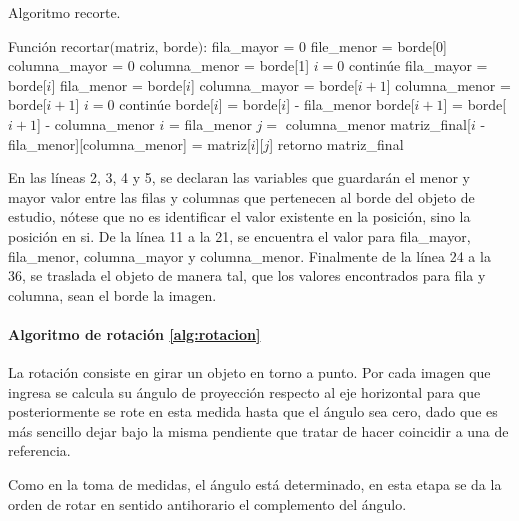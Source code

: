 \begin{algorithm}
\caption{Algoritmo recorte.}
\label{alg:extraccion}
\begin{algorithmic}[1]
\STATE Función recortar$($matriz, borde$)$:
\STATE fila\_mayor = 0
\STATE file\_menor = borde[0]
\STATE columna\_mayor = 0
\STATE columna\_menor = borde[1]
\STATE $i = 0$
\STATE continúe
\ENDIF
{}
\STATE fila\_mayor = borde[$i$]
\ENDIF
{}
\STATE fila\_menor = borde[$i$]
\ENDIF
{}
\STATE columna\_mayor = borde[$i + 1$]
\ENDIF
{}
\STATE columna\_menor = borde[$i +  1$]
\ENDIF
\ENDWHILE
\STATE $i = 0$
\STATE continúe
\ENDIF
\STATE borde[$i$] = borde[$i$] - fila\_menor
\STATE borde[$i + 1$] = borde[$i + 1$] - columna\_menor
\STATE $i$ = fila\_menor
\ENDWHILE
{}
\STATE $j = $ columna\_menor
\STATE matriz\_final[$i$ - fila\_menor][columna\_menor] = matriz[$i$][$j$]
\ENDWHILE
\ENDWHILE
\STATE retorno matriz\_final
\end{algorithmic}
\end{algorithm}

En las líneas 2, 3, 4 y 5, se declaran las variables que guardarán el
menor y mayor valor entre las filas y columnas que pertenecen al borde
del objeto de estudio, nótese que no es identificar el valor existente
en la posición, sino la posición en si. De la línea 11 a la 21, se
encuentra el valor para fila\_mayor, fila\_menor, columna\_mayor y
columna\_menor. Finalmente de la línea 24 a la 36, se traslada el
objeto de manera tal, que los valores encontrados para fila y columna,
sean el borde la imagen.

\paragraph{Algoritmo de rotación \ref{alg:rotacion}}

La rotación consiste en girar un objeto en torno a punto. Por cada
imagen que ingresa se calcula su ángulo de proyección respecto al eje
horizontal para que posteriormente se rote en esta medida hasta que el
ángulo sea cero, dado que es más sencillo dejar bajo la misma
pendiente que tratar de hacer coincidir a una de referencia.

Como en la toma de medidas, el ángulo está determinado, en esta etapa
se da la orden de rotar en sentido antihorario el complemento del
ángulo. 

